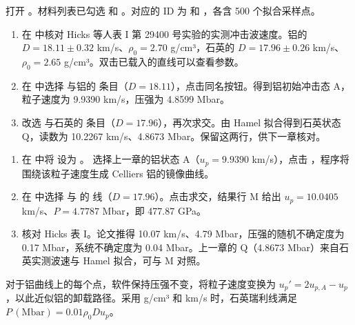 打开 。材料列表已勾选  和 。对应的 ID 为  和 ，各含 500 个拟合采样点。
\begin{enumerate}
\item 在  中核对 Hicks 等人表 I 第 29400 号实验的实测冲击波速度。铝的 $D=18.11\pm0.32$ km/s、$\rho_0=2.70$ g/cm³，石英的 $D=17.96\pm0.26$ km/s、$\rho_0=2.65$ g/cm³。双击已载入的直线可以查看参数。
\item 在  中选择  与铝的  条目（$D=18.11$），点击同名按钮。得到铝初始冲击态 A，粒子速度为 9.9390 km/s，压强为 4.8599 Mbar。
\item 改选  与石英的  条目（$D=17.96$），再次求交。由 Hamel 拟合得到石英状态 Q，读数为 10.2267 km/s、4.8673 Mbar。保留这两行，供下一章核对。
\end{enumerate}

\begin{enumerate}
\item 在  中将  设为 。 选择上一章的铝状态 A（$u_p=9.9390$ km/s），点击 ，程序将围绕该粒子速度生成 Celliers 铝的镜像曲线。
\item 在  中选择  与  的  线（$D=17.96$）。点击求交，结果行 M 给出 $u_p=10.0405$ km/s、$P=4.7787$ Mbar，即 477.87 GPa。
\item 核对 Hicks 表 I。论文推得 10.07 km/s、4.79 Mbar，压强的随机不确定度为 0.17 Mbar，系统不确定度为 0.04 Mbar。上一章的 Q（4.8673 Mbar）来自石英实测波速与 Hamel 拟合，可与 M 对照。
\end{enumerate}
对于铝曲线上的每个点，软件保持压强不变，将粒子速度变换为 $u_p'=2u_{p,A}-u_p$，以此近似铝的卸载路径。采用 g/cm³ 和 km/s 时，石英瑞利线满足 $P\,(\mathrm{Mbar})=0.01\rho_0 D u_p$。

